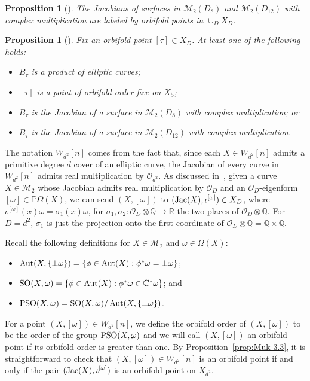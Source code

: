 \documentclass[a4paper,11pt]{amsart}
\numberwithin{equation}{section}
\numberwithin{figure}{section}
\numberwithin{table}{section}
\newtheorem{proposition}[theorem]{Proposition}
\newcommand{\C}{\mathbb{C}}
\newcommand{\R}{\mathbb{R}}
\newcommand{\Q}{\mathbb{Q}}
\DeclareMathOperator{\SO}{{\rm{SO}}}
\DeclareMathOperator{\PSO}{{\rm{PSO}}}
\DeclareMathOperator{\Aut}{{\rm{Aut}}}
\DeclareMathOperator{\Jac}{{\rm{Jac}}}
\begin{document}
\begin{proposition}[{\cite[Proposition 3.4]{Muk}}]
    The Jacobians of surfaces in $\mathcal{M}_{2}(D_{8})$ and $\mathcal{M}_{2}(D_{12})$ with complex multiplication are labeled by orbifold points in $\cup_{D}X_D$.
\end{proposition}

\begin{proposition}[{\cite[Proposition 3.5]{Muk}}]
    Fix an orbifold point $[\tau]\in X_{D}$. At least one of the following holds:
    \begin{itemize}
        \item $B_{\tau}$ is a product of elliptic curves;
        \item $[\tau]$ is a point of orbifold order five on $X_{5}$;
        \item $B_{\tau}$ is the Jacobian of a surface in $\mathcal{M}_{2}(D_8)$ with complex multiplication; or
        \item $B_{\tau}$ is the Jacobian of a surface in $\mathcal{M}_{2}(D_{12})$ with complex multiplication.
    \end{itemize}
\end{proposition}

The notation $W_{d^{2}}[n]$ comes from the fact that, since each $X\in W_{d^{2}}[n]$ admits a primitive degree $d$ cover of an elliptic curve, the Jacobian of every curve in $W_{d^2}[n]$ admits real multiplication by $\mathcal{O}_{d^{2}}$. As discussed in~\cite[\S 4]{Muk}, given a curve $X\in\mathcal{M}_{2}$ whose Jacobian admits real multiplication by $\mathcal{O}_{D}$ and an $\mathcal{O}_{D}$-eigenform $[\omega]\in\mathbb{P}\Omega(X)$, we can send $(X,[\omega])$ to $(\Jac(X),\iota^{[\omega]})\in X_{D}$, where $\iota^{[\omega]}(x)\omega = \sigma_{1}(x)\omega$, for $\sigma_{1},\sigma_{2}:\mathcal{O}_{D}\otimes\Q\to\R$ the two places of $\mathcal{O}_{D}\otimes\Q$. For $D = d^{2}$, $\sigma_{1}$ is just the projection onto the first coordinate of $\mathcal{O}_{D}\otimes\Q = \Q\times\Q$.

Recall the following definitions for $X\in\mathcal{M}_{2}$ and $\omega\in\Omega(X)$:
\begin{itemize}
    \item $\Aut(X,\{\pm\omega\}) = \{\phi\in\Aut(X):\phi^{*}\omega = \pm \omega\}$;
    \item $\SO(X,\omega) = \{\phi\in\Aut(X):\phi^{*}\omega \in\C^{*} \omega\}$; and
    \item $\PSO(X,\omega) = \SO(X,\omega)/\Aut(X,\{\pm\omega\})$.
\end{itemize}
For a point $(X,[\omega]) \in W_{d^{2}}[n]$, we define the orbifold order of $(X,[\omega])$ to be the order of the group $\PSO(X,\omega)$ and we will call $(X,[\omega])$ an orbifold point if its orbifold order is greater than one. By Proposition~\ref{prop:Muk-3.3}, it
is straightforward to check that $(X,[\omega])\in W_{d^{2}}[n]$ is an orbifold point if and only if the pair $(\Jac(X),\iota^{[\omega]})$ is an orbifold point on $X_{d^2}$.
\end{document}

